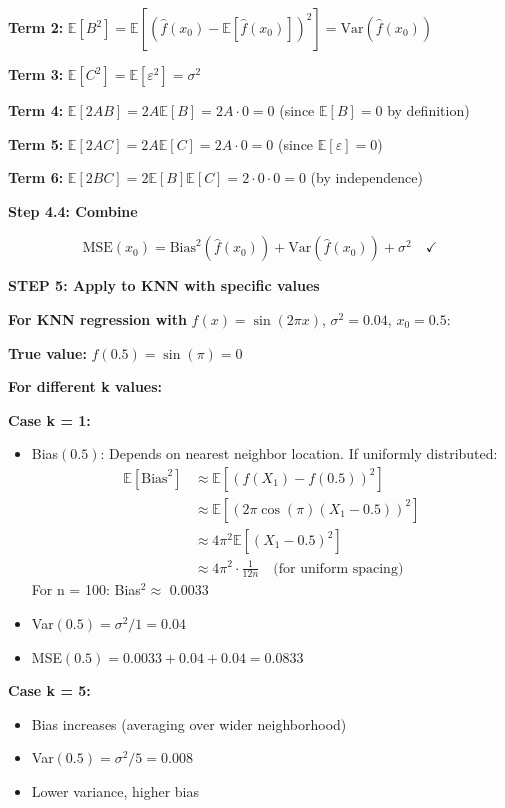 \documentclass[12pt]{article}
\begin{document}
\begin{solution}
\textbf{Term 2:} $\mathbb{E}[B^2] = \mathbb{E}[(\hat{f}(x_0) - \mathbb{E}[\hat{f}(x_0)])^2] = \text{Var}(\hat{f}(x_0))$

\textbf{Term 3:} $\mathbb{E}[C^2] = \mathbb{E}[\varepsilon^2] = \sigma^2$

\textbf{Term 4:} $\mathbb{E}[2AB] = 2A\mathbb{E}[B] = 2A \cdot 0 = 0$ (since $\mathbb{E}[B] = 0$ by definition)

\textbf{Term 5:} $\mathbb{E}[2AC] = 2A\mathbb{E}[C] = 2A \cdot 0 = 0$ (since $\mathbb{E}[\varepsilon] = 0$)

\textbf{Term 6:} $\mathbb{E}[2BC] = 2\mathbb{E}[B]\mathbb{E}[C] = 2 \cdot 0 \cdot 0 = 0$ (by independence)

\textbf{Step 4.4: Combine}

\[
\text{MSE}(x_0) = \text{Bias}^2(\hat{f}(x_0)) + \text{Var}(\hat{f}(x_0)) + \sigma^2 \quad \boxed{\checkmark}
\]

\textbf{STEP 5: Apply to KNN with specific values}

\textbf{For KNN regression with } $f(x) = \sin(2\pi x)$, $\sigma^2 = 0.04$, $x_0 = 0.5$:

\textbf{True value:} $f(0.5) = \sin(\pi) = 0$

\textbf{For different k values:}

\textbf{Case k = 1:}
\begin{itemize}
    \item Bias$(0.5)$: Depends on nearest neighbor location. If uniformly distributed:
    \begin{align*}
        \mathbb{E}[\text{Bias}^2] &\approx \mathbb{E}[(f(X_1) - f(0.5))^2] \\
        &\approx \mathbb{E}[(2\pi\cos(\pi)(X_1 - 0.5))^2] \\
        &\approx 4\pi^2\mathbb{E}[(X_1 - 0.5)^2] \\
        &\approx 4\pi^2 \cdot \frac{1}{12n} \quad \text{(for uniform spacing)}
    \end{align*}
    For n = 100: Bias$^2 \approx$ 0.0033
    \item Var$(0.5) = \sigma^2/1 = 0.04$
    \item MSE$(0.5) = 0.0033 + 0.04 + 0.04 = 0.0833$
\end{itemize}

\textbf{Case k = 5:}
\begin{itemize}
    \item Bias increases (averaging over wider neighborhood)
    \item Var$(0.5) = \sigma^2/5 = 0.008$
    \item Lower variance, higher bias
\end{itemize}


\end{solution}
\end{document}
